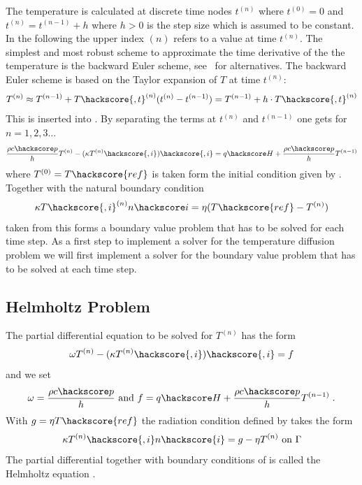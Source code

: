 The temperature is calculated at discrete time nodes $t^{(n)}$ where 
$t^{(0)}=0$ and  $t^{(n)}=t^{(n-1)}+h$ where $h>0$ is the step size which is assumed to be constant. 
In the following the upper index ${(n)}$ refers to a value at time $t^{(n)}$. The simplest
and most robust scheme to approximate the time derivative of the the temperature is 
the backward Euler
 scheme, see~\cite{XXX} for alternatives. The backward Euler 
scheme is based
on the Taylor expansion of $T$ at time $t^{(n)}$:
\begin{equation}
T^{(n)}\approx T^{(n-1)}+T\hackscore{,t}^{(n)}(t^{(n)}-t^{(n-1)})
=T^{(n-1)} + h \cdot T\hackscore{,t}^{(n)}
\label{DIFFUSION TEMP EQ 6}
\end{equation}
This is inserted into . By separating the terms at 
$t^{(n)}$ and  $t^{(n-1)}$ one gets for $n=1,2,3\ldots$
\begin{equation}
\frac{\rho c\hackscore p}{h} T^{(n)} - (\kappa T^{(n)}\hackscore{,i})\hackscore{,i} = q\hackscore H +  \frac{\rho c\hackscore p}{h} T^{(n-1)}
\label{DIFFUSION TEMP EQ 7}
\end{equation}
where $T^{(0)}=T\hackscore{ref}$ is taken form the initial condition given by .
Together with the natural boundary condition 
\begin{equation}
 \kappa T\hackscore{,i}^{(n)} n\hackscore i = \eta (T\hackscore{ref}-T^{(n)}) 
\label{DIFFUSION TEMP EQ 2222}
\end{equation}
taken from 
this forms a boundary value problem that has to be solved for each time step. 
As a first step to implement a solver for the temperature diffusion problem we will 
first implement a solver for the  boundary value problem that has to be solved at each time step.

\subsection{\label{DIFFUSION HELM SEC}Helmholtz Problem}
The partial differential equation to be solved for $T^{(n)}$ has the form 
\begin{equation}
\omega T^{(n)}  - (\kappa T^{(n)}\hackscore{,i})\hackscore{,i} = f
\label{DIFFUSION HELM EQ 1}
\end{equation}
and we set
\begin{equation}
\omega=\frac{\rho c\hackscore p}{h} \mbox{ and } f=q\hackscore H +\frac{\rho c\hackscore p}{h}T^{(n-1)} \;.
\label{DIFFUSION HELM EQ 1b}
\end{equation}
With $g=\eta T\hackscore{ref}$ the radiation condition defined by 
takes the form 
\begin{equation}
\kappa T^{(n)}\hackscore{,i} n\hackscore{i} =  g - \eta T^{(n)}\mbox{ on } \Gamma
\label{DIFFUSION HELM EQ 2}
\end{equation}
The partial differential  together with boundary conditions of 
is called the Helmholtz equation . 

